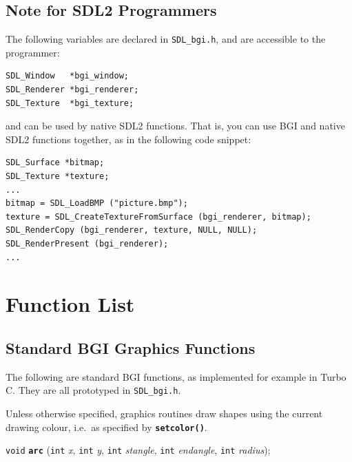 \documentclass[a4paper,11pt]{article}
\newcommand{\V}{\texttt{void}}      %
\newcommand{\I}{\texttt{int}}       %
\newcommand{\func}[1]{\textbf{\texttt{#1}}}  %
\newcommand{\A}[1]{\emph{#1}}       %
\newcommand{\F}[1]{\texttt{#1}}     %
\newenvironment{bgi}
{ %
  \begin{snugshade}
}
{ %
  \end{snugshade}
}
\begin{document}

\subsection{Note for SDL2 Programmers}

The following variables are declared in \F{SDL\_bgi.h}, and are
accessible to the programmer:

\begin{small}
\begin{spacing}{0.85}
\begin{verbatim}
SDL_Window   *bgi_window;
SDL_Renderer *bgi_renderer;
SDL_Texture  *bgi_texture;
\end{verbatim}
\end{spacing}
\end{small}

and can be used by native SDL2 functions. That is, you can use BGI and
native SDL2 functions together, as in the following code snippet:

\begin{small}
\begin{spacing}{0.85}
\begin{verbatim}
SDL_Surface *bitmap;
SDL_Texture *texture;
...
bitmap = SDL_LoadBMP ("picture.bmp");
texture = SDL_CreateTextureFromSurface (bgi_renderer, bitmap);
SDL_RenderCopy (bgi_renderer, texture, NULL, NULL);
SDL_RenderPresent (bgi_renderer);
...
\end{verbatim}
\end{spacing}
\end{small}


\section{Function List}

\subsection{Standard BGI Graphics Functions}

The following are standard BGI functions, as implemented for example
in Turbo C. They are all prototyped in \F{SDL\_bgi.h}.

Unless otherwise specified, graphics routines draw shapes using the
current drawing colour, i.e.\ as specified by \func{setcolor()}.


\begin{bgi}
  \V{} \func{arc} (\I{} \A{x}, \I{} \A{y}, \I{} \A{stangle}, \I{}
  \A{endangle}, \I{} \A{radius});
\end{bgi}
\end{document}
